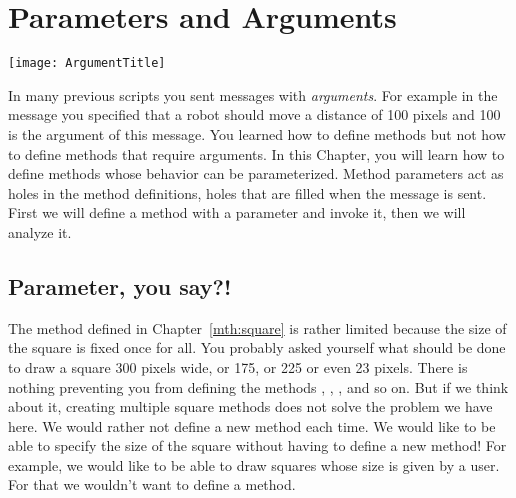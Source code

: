 \ifx\wholebook\relax\else



\fi


\chapter{Parameters and Arguments}\label{ch:argumenting}

\begin{chapterfigure}
\texttt{[image: ArgumentTitle]}
\end{chapterfigure}

\newcommand{\replace}[2]{Up until now}{In many previous scripts} you sent messages with \emph{arguments}. For example\newcommand{\remove}[1]{,} in the message  you specified that a robot should move a distance of 100 pixels\newcommand{\add}[1]{,} and 100 is the argument of this message. You learned how to define methods but not how to define methods that require arguments. \newcommand{\add}[1]{\paragraph
}
In this Chapter, you \newcommand{\replace}[2]{shall}{will} learn how to define methods whose behavior can be parameterized. Method parameters act as holes in the method definitions, holes that are filled when the message is sent.  First we will define a method with a parameter and invoke it, then we will analyze it.


\section{Parameter, you say?!}
The method  defined in Chapter~\ref{mth:square} is
rather limited because the size of the square is fixed once \newcommand{\add}[1]{and} for all. You \newcommand{\replace}[2]{certainly}{probably} asked yourself what should be done to draw a square \newcommand{\remove}[1]{of} 300 pixels \newcommand{\replace}[2]{or,}{wide, or} 175, or 225 or even 23 pixels\newcommand{\add}[1]{ wide}.  There is nothing preventing you \newcommand{\replace}[2]{to define}{from defining} the methods , , ,  and so on. \newcommand{\add}[1]{\paragraph
}
But if we \newcommand{\replace}[2]{really look at}{think about} it, creating multiple square methods does not solve the problem we have here. \newcommand{\replace}[2]{Because we do not want to}{We would rather not} define a new method each time. We would like to be able to specify the size of the square without having to define \newcommand{\remove}[1]{each time} a new method\newcommand{\add}[1]{ for every size}!
For example, we would like to be able to draw squares whose size is given by a user\newcommand{\replace}[2]{ and for}{. For} that we \newcommand{\replace}[2]{do not}{wouldn't} want to define a method.

